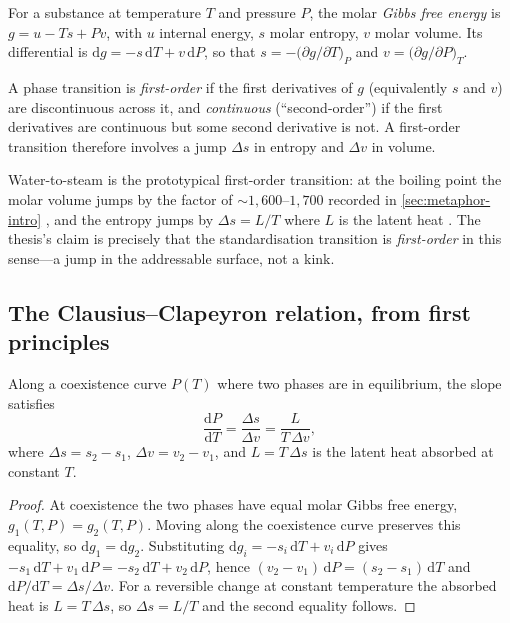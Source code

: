 \begin{definition}
For a substance at temperature $T$ and pressure $P$, the molar \emph{Gibbs free
energy} is $g=u-Ts+Pv$, with $u$ internal energy, $s$ molar entropy, $v$ molar
volume. Its differential is $\mathrm dg=-s\,\mathrm dT+v\,\mathrm dP$, so that
$s=-\bigl(\partial g/\partial T\bigr)_P$ and
$v=\bigl(\partial g/\partial P\bigr)_T$.
\end{definition}

\begin{definition}
A phase transition is \emph{first-order} if the first derivatives of $g$
(equivalently $s$ and $v$) are discontinuous across it, and \emph{continuous}
(``second-order'') if the first derivatives are continuous but some second
derivative is not. A first-order transition therefore involves a jump $\Delta s$
in entropy and $\Delta v$ in volume.
\end{definition}

Water-to-steam is the prototypical first-order transition: at the boiling point
the molar volume jumps by the factor of ${\sim}1{,}600$--$1{,}700$ recorded in
\cref{sec:metaphor-intro} \citep{engtoolbox-steam,nationalboard-steam}, and the
entropy jumps by $\Delta s=L/T$ where $L$ is the latent heat
\citep{latentheat-openstax}. The thesis's claim is precisely that the
standardisation transition is \emph{first-order} in this sense---a jump in the
addressable surface, not a kink.

\subsection{The Clausius--Clapeyron relation, from first principles}
\label{sec:an-clausius}

\begin{theorem}
\label{thm:clausius}
Along a coexistence curve $P(T)$ where two phases are in equilibrium, the slope
satisfies
\[
\frac{\mathrm dP}{\mathrm dT}=\frac{\Delta s}{\Delta v}=\frac{L}{T\,\Delta v},
\]
where $\Delta s=s_2-s_1$, $\Delta v=v_2-v_1$, and $L=T\,\Delta s$ is the latent
heat absorbed at constant $T$.
\end{theorem}
\begin{proof}
At coexistence the two phases have equal molar Gibbs free energy,
$g_1(T,P)=g_2(T,P)$. Moving along the coexistence curve preserves this equality,
so $\mathrm dg_1=\mathrm dg_2$. Substituting
$\mathrm dg_i=-s_i\,\mathrm dT+v_i\,\mathrm dP$ gives
$-s_1\,\mathrm dT+v_1\,\mathrm dP=-s_2\,\mathrm dT+v_2\,\mathrm dP$, hence
$(v_2-v_1)\,\mathrm dP=(s_2-s_1)\,\mathrm dT$ and
$\mathrm dP/\mathrm dT=\Delta s/\Delta v$. For a reversible change at constant
temperature the absorbed heat is $L=T\,\Delta s$, so $\Delta s=L/T$ and the second
equality follows.
\end{proof}

